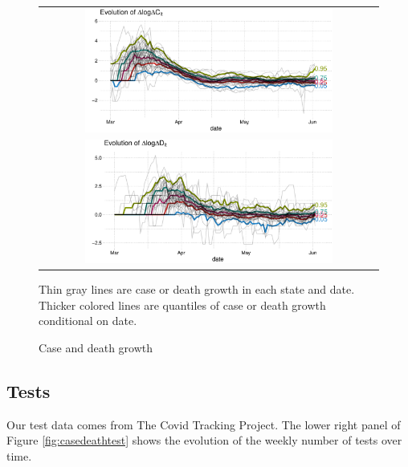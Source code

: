 \documentclass[11pt,reqno,letter]{amsart}
\theoremstyle{definition}
\begin{document}
\begin{figure}[!ht]\caption{Case and death growth \label{fig:growthq}}
  \centering
  \begin{minipage}{\textwidth}
    \centering
    \begin{tabular}{c}
      \includegraphics[width=0.75\textwidth]{tables_and_figures/casequantiles}
      \\
      \includegraphics[width=0.75\textwidth]{tables_and_figures/deathquantiles}
    \end{tabular}
  \end{minipage}
     \begin{flushleft}
      \footnotesize Thin gray lines are case or death growth in each
      state and date. Thicker colored lines are quantiles of case or
      death growth conditional on date.      \end{flushleft}
\end{figure}


\subsection{Tests}

Our test data comes from The Covid Tracking Project. The lower right panel of Figure
\ref{fig:casedeathtest} shows the evolution of the weekly number of tests over time.
\end{document}
